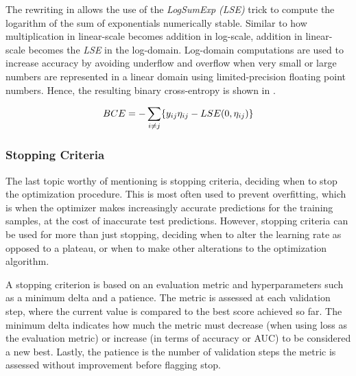         The rewriting in  allows the use of the \emph{LogSumExp (LSE)} trick to compute the logarithm of the sum of exponentials numerically stable. Similar to how multiplication in linear-scale becomes addition in log-scale, addition in linear-scale becomes the \emph{LSE} in the log-domain. Log-domain computations are used to increase accuracy by avoiding underflow and overflow when very small or large numbers are represented in a linear domain using limited-precision floating point numbers. Hence, the resulting binary cross-entropy is shown in .
        
        \begin{equation}\label{eq:bce-log-domain-rewrite}
            BCE = -\sum_{i\neq j}\{ \sub(y) \sub(\eta) - LSE(0,\sub(\eta)) \}
        \end{equation}
    
    \subsubsection{Stopping Criteria}
    
        The last topic worthy of mentioning is stopping criteria, deciding when to stop the optimization procedure. This is most often used to prevent overfitting, which is when the optimizer makes increasingly accurate predictions for the training samples, at the cost of inaccurate test predictions. However, stopping criteria can be used for more than just stopping, deciding when to alter the learning rate as opposed to a plateau, or when to make other alterations to the optimization algorithm. 
        
        A stopping criterion is based on an evaluation metric and hyperparameters such as a minimum delta and a patience. The metric is assessed at each validation step, where the current value is compared to the best score achieved so far. The minimum delta indicates how much the metric must decrease (when using loss as the evaluation metric) or increase (in terms of accuracy or AUC) to be considered a new best. Lastly, the patience is the number of validation steps the metric is assessed without improvement before flagging stop.

